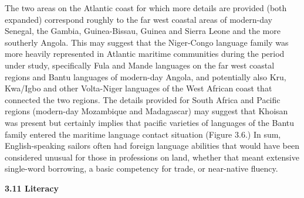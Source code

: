 \begin{styleStandard}
The two areas on the Atlantic coast for which more details are provided (both expanded) correspond roughly to the far west coastal areas of modern-day Senegal, the Gambia, Guinea-Bissau, Guinea and Sierra Leone and the more southerly Angola. This may suggest that the Niger-Congo language family was more heavily represented in Atlantic maritime communities during the period under study, specifically Fula and Mande languages on the far west coastal regions and Bantu languages of modern-day Angola, and potentially also Kru, Kwa/Igbo and other Volta-Niger languages of the West African coast that connected the two regions. The details provided for South Africa and Pacific regions (modern-day Mozambique and Madagascar) may suggest that Khoisan was present but certainly implies that pacific varieties of languages of the Bantu family entered the maritime language contact situation (Figure 3.6.) In sum, English-speaking sailors often had foreign language abilities that would have been considered unusual for those in professions on land, whether that meant extensive single-word borrowing, a basic competency for trade, or near-native fluency. 
\end{styleStandard}


\begin{styleStandard}
  [Warning: Image ignored] %
 
\end{styleStandard}


\begin{styleStandard}
\end{styleStandard}


\begin{styleStandard}
\textbf{3.11 Literacy}
\end{styleStandard}



